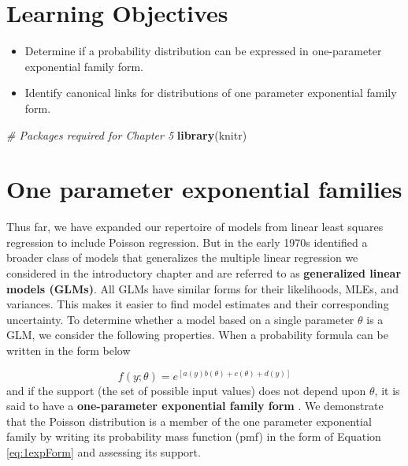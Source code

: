 \documentclass[
]{krantz}
\newenvironment{Shaded}{\begin{snugshade}}{\end{snugshade}}
\newcommand{\CommentTok}[1]{\textcolor[rgb]{0.37,0.37,0.37}{\textit{#1}}}
\newcommand{\KeywordTok}[1]{\textcolor[rgb]{0.27,0.27,0.27}{\textbf{#1}}}
\newcommand{\NormalTok}[1]{#1}
\providecommand{\tightlist}{%
  \setlength{\itemsep}{0pt}\setlength{\parskip}{0pt}}
\begin{document}
\hypertarget{learning-objectives-1}{%
\section{Learning Objectives}\label{learning-objectives-1}}

\begin{itemize}
\tightlist
\item
  Determine if a probability distribution can be expressed in one-parameter exponential family form.
\item
  Identify canonical links for distributions of one parameter exponential family form.
\end{itemize}

\begin{Shaded}
\begin{Highlighting}[]
\CommentTok{# Packages required for Chapter 5}
\KeywordTok{library}\NormalTok{(knitr)}
\end{Highlighting}
\end{Shaded}

\hypertarget{one-parameter-exponential-families}{%
\section{One parameter exponential families}\label{one-parameter-exponential-families}}

Thus far, we have expanded our repertoire of models from linear least squares regression to include Poisson regression. But in the early 1970s \citet{Nelder1972} identified a broader class of models that generalizes the multiple linear regression we considered in the introductory chapter and are referred to as \textbf{generalized linear models (GLMs)}.  All GLMs have similar forms for their likelihoods, MLEs, and variances. This makes it easier to find model estimates and their corresponding uncertainty. To determine whether a model based on a single parameter \(\theta\) is a GLM, we consider the following properties.
When a probability formula can be written in the form below

\begin{equation}
f(y;\theta)=e^{[a(y)b(\theta)+c(\theta)+d(y)]}
\label{eq:1expForm}
\end{equation}
and if the support (the set of possible input values) does not depend upon \(\theta\), it is said to have a \textbf{one-parameter exponential family form} . We demonstrate that the Poisson distribution is a member of the one parameter exponential family by writing its probability mass function (pmf) in the form of Equation \eqref{eq:1expForm} and assessing its support.
\end{document}
